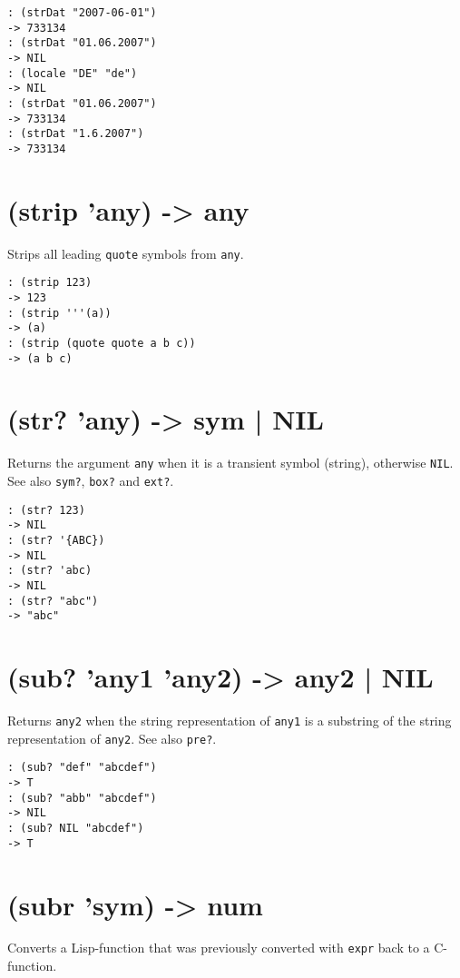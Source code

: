 {{{{{{{{\begin{verbatim}
: (strDat "2007-06-01")
-> 733134
: (strDat "01.06.2007")
-> NIL
: (locale "DE" "de")
-> NIL
: (strDat "01.06.2007")
-> 733134
: (strDat "1.6.2007")
-> 733134
\end{verbatim}

 
\section{(strip 'any) -> any}
\label{sec-8-1-19-40}


Strips all leading \texttt{quote} symbols from \texttt{any}.


\begin{verbatim}
: (strip 123)
-> 123
: (strip '''(a))
-> (a)
: (strip (quote quote a b c))
-> (a b c)
\end{verbatim}

 
\section{(str? 'any) -> sym | NIL}
\label{sec-8-1-19-41}


Returns the argument \texttt{any} when it is a transient symbol (string),
otherwise \texttt{NIL}. See also \texttt{sym?}, \texttt{box?} and \texttt{ext?}.


\begin{verbatim}
: (str? 123)
-> NIL
: (str? '{ABC})
-> NIL
: (str? 'abc)
-> NIL
: (str? "abc")
-> "abc"
\end{verbatim}

 
\section{(sub? 'any1 'any2) -> any2 | NIL}
\label{sec-8-1-19-42}


Returns \texttt{any2} when the string representation of \texttt{any1} is a substring
of the string representation of \texttt{any2}. See also \texttt{pre?}.


\begin{verbatim}
: (sub? "def" "abcdef")
-> T
: (sub? "abb" "abcdef")
-> NIL
: (sub? NIL "abcdef")
-> T
\end{verbatim}

 
\section{(subr 'sym) -> num}
\label{sec-8-1-19-43}


Converts a Lisp-function that was previously converted with \texttt{expr} back
to a C-function.


}}}}}}}}
